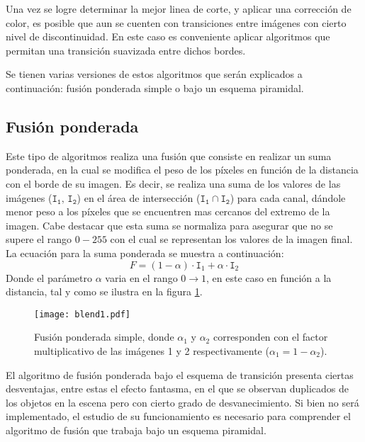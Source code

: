 Una vez se logre determinar la mejor linea de corte, y aplicar una corrección de color, es posible que aun se cuenten con transiciones entre imágenes con cierto nivel de discontinuidad. En este caso es conveniente aplicar algoritmos que permitan una transición suavizada entre dichos bordes.

Se tienen varias versiones de estos algoritmos que serán explicados a continuación: fusión ponderada simple o bajo un esquema piramidal.

\subsection{Fusión ponderada} \label{feathering}
Este tipo de algoritmos realiza una fusión que consiste en realizar un suma ponderada, en la cual se modifica el peso de los píxeles en función de la distancia con el borde de su imagen. Es decir, se realiza una suma de los valores de las imágenes ($\mathtt{I_1},\, \mathtt{I_2}$) en el área de intersección ($\mathtt{I_1}\cap \mathtt{I_2}$) para cada canal, dándole menor peso a los píxeles que se encuentren mas cercanos del extremo de la imagen. Cabe destacar que esta suma se normaliza para asegurar que no se supere el rango $0-255$ con el cual se representan los valores de la imagen final. La ecuación para la suma ponderada se muestra a continuación:
\begin{displaymath}
	F = (1-\alpha)\cdot \mathtt{I}_1 + \alpha\cdot \mathtt{I}_2
\end{displaymath} 
Donde el parámetro $\alpha$ varia en el rango $0\to 1$, en este caso en función a la distancia, tal y como se ilustra en la figura \ref{imagen:blend-simple}.


\begin{figure}[h]
	\centering
	\texttt{[image: blend1.pdf]}
	\caption[Fusión ponderada simple]{Fusión ponderada simple, donde $\alpha_1$ y $\alpha_2$ corresponden con el factor multiplicativo de las imágenes 1 y 2 respectivamente ($\alpha_1 = 1 - \alpha_2$).}
	\label{imagen:blend-simple}
\end{figure}

El algoritmo de fusión ponderada bajo el esquema de transición presenta ciertas desventajas, entre estas el efecto fantasma, en el que se observan duplicados de los objetos en la escena pero con cierto grado de desvanecimiento. Si bien no será implementado, el estudio de su funcionamiento es necesario para comprender el algoritmo de fusión que trabaja bajo un esquema piramidal.

